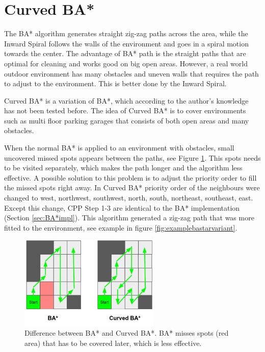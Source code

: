 \section{Curved BA*}
The BA* algorithm generates straight zig-zag paths across the area, while the Inward Spiral follows the walls of the environment and goes in a spiral motion towards the center. The advantage of BA* path is the straight paths that are optimal for cleaning and works good on big open areas. However, a real world outdoor environment has many obstacles and uneven walls that requires the path to adjust to the environment. This is better done by the Inward Spiral. 

Curved BA* is a variation of BA*, which according to the author's knowledge has not been tested before. The idea of Curved BA* is to cover environments such as multi floor parking garages that consists of both open areas and many obstacles. 

When the normal BA* is applied to an environment with obstacles, small uncovered missed spots appears between the paths, see Figure \ref{fig:bastarfail}. This spots needs to be visited separately, which makes the path longer and the algorithm less effective. A possible solution to this problem is to adjust the priority order to fill the missed spots right away. In Curved BA* priority order of the neighbours were changed to west, northwest, southwest, north, south, northeast, southeast, east. Except this change, CPP Step 1-3 are identical to the BA* implementation (Section \ref{sec:BA*impl}). This algorithm generated a zig-zag path that was more fitted to the environment, see example in figure \ref{fig:examplebastarvariant}.

\begin{figure}
    \centering
    \includegraphics[width=0.6\textwidth]{figures/bastarfail.png}
    \caption{Difference between BA* and Curved BA*. BA* misses spots (red area) that has to be covered later, which is less effective.}
    \label{fig:bastarfail}
\end{figure}

